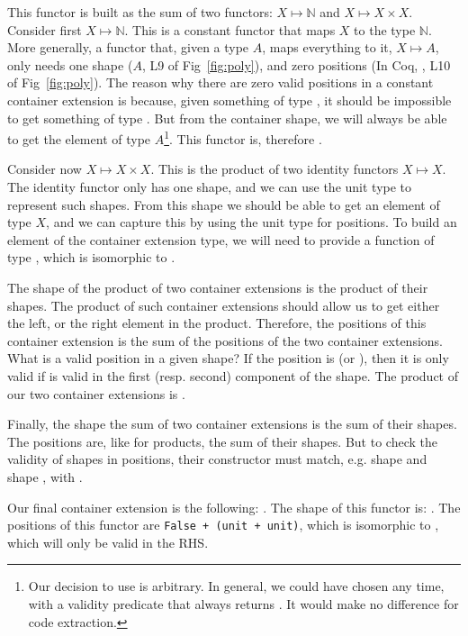 \documentclass[anonymous, a4paper, UKenglish, cleveref, autoref, thm-restate]{lipics-v2021}
\begin{document}
This functor is built as the sum of two functors: $X \mapsto \mathbb{N}$ and $X \mapsto
X \times X$. Consider first $X \mapsto \mathbb{N}$. This is a constant functor
that maps $X$ to the type $\mathbb{N}$. More generally, a functor that, given a
type $A$, maps everything to it, $X \mapsto A$, only needs one shape ($A$, L9
of Fig~\ref{fig:poly}), and zero positions (In Coq, ,
L10 of Fig~\ref{fig:poly}). The reason why there are zero valid positions in
a constant container extension is because, given something of type
, it should be impossible to get
something of type . But from the container shape, we will
always be able to get the element of type $A$\footnote{%
  Our decision to use  is arbitrary. In general, we
  could have chosen any time, with a validity predicate that always returns
  . It would make no difference for code extraction.
}. This functor is, therefore .

Consider now $X \mapsto X \times X$. This is the product of two
identity functors $X \mapsto X$. The identity functor only has one shape, and
we can use the unit type to represent such shapes. From this shape we should be
able to get an element of type $X$, and we can capture this by using the unit
type for positions. To build an element of the container extension type, we
will need to provide a function of type , which is
isomorphic to .

The shape of the product of two container extensions is the product of their
shapes. The product of such container extensions should allow us to get either
the left, or the right element in the product. Therefore, the positions of this
container extension is the sum of the positions of the two container
extensions. What is a valid position in a given shape? If the position is
 (or ), then it is only valid if
 is valid in the first (resp. second) component of the
shape. The product of our two container extensions is
.

Finally, the shape the sum of two container extensions is the sum of their
shapes. The positions are, like for products, the sum of their shapes. But to
check the validity of shapes in positions, their constructor must match, e.g.
shape  and shape , with
.

Our final container extension is the following:
.
The shape of this functor is:
. The positions of this functor
are \texttt{False + (unit + unit)}, which is isomorphic
to , which will only be valid in the RHS.
\end{document}
